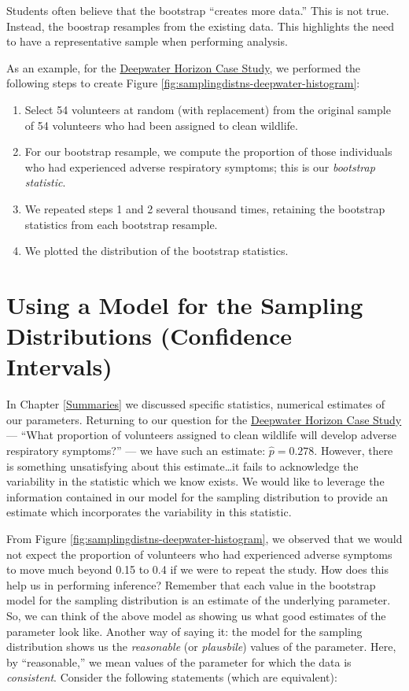 \documentclass[]{book}
\providecommand{\tightlist}{%
  \setlength{\itemsep}{0pt}\setlength{\parskip}{0pt}}
\theoremstyle{plain}
\theoremstyle{mydefn}
\theoremstyle{myexmpl}
\theoremstyle{remark}
\let\BeginKnitrBlock\begin \let\EndKnitrBlock\end
\let\BeginKnitrBlock\begin \let\EndKnitrBlock\end
\begin{document}
\BeginKnitrBlock{rmdtip}
Students often believe that the bootstrap ``creates more data.'' This is
not true. Instead, the boostrap resamples from the existing data. This
highlights the need to have a representative sample when performing
analysis.
\EndKnitrBlock{rmdtip}

As an example, for the \protect\hyperlink{CaseDeepwater}{Deepwater
Horizon Case Study}, we performed the following steps to create Figure
\ref{fig:samplingdistns-deepwater-histogram}:

\begin{enumerate}
\def\labelenumi{\arabic{enumi}.}
\tightlist
\item
  Select 54 volunteers at random (with replacement) from the original
  sample of 54 volunteers who had been assigned to clean wildlife.
\item
  For our bootstrap resample, we compute the proportion of those
  individuals who had experienced adverse respiratory symptoms; this is
  our \emph{bootstrap statistic}.
\item
  We repeated steps 1 and 2 several thousand times, retaining the
  bootstrap statistics from each bootstrap resample.
\item
  We plotted the distribution of the bootstrap statistics.
\end{enumerate}

\section{Using a Model for the Sampling Distributions (Confidence
Intervals)}\label{using-a-model-for-the-sampling-distributions-confidence-intervals}

In Chapter \ref{Summaries} we discussed specific statistics, numerical
estimates of our parameters. Returning to our question for the
\protect\hyperlink{CaseDeepwater}{Deepwater Horizon Case Study} ---
``What proportion of volunteers assigned to clean wildlife will develop
adverse respiratory symptoms?'' --- we have such an estimate:
\(\widehat{p} = 0.278\). However, there is something unsatisfying about
this estimate\ldots{}it fails to acknowledge the variability in the
statistic which we know exists. We would like to leverage the
information contained in our model for the sampling distribution to
provide an estimate which incorporates the variability in this
statistic.

From Figure \ref{fig:samplingdistns-deepwater-histogram}, we observed
that we would not expect the proportion of volunteers who had
experienced adverse symptoms to move much beyond 0.15 to 0.4 if we were
to repeat the study. How does this help us in performing inference?
Remember that each value in the bootstrap model for the sampling
distribution is an estimate of the underlying parameter. So, we can
think of the above model as showing us what good estimates of the
parameter look like. Another way of saying it: the model for the
sampling distribution shows us the \emph{reasonable} (or
\emph{plausbile}) values of the parameter. Here, by ``reasonable,'' we
mean values of the parameter for which the data is \emph{consistent}.
Consider the following statements (which are equivalent):
\end{document}

